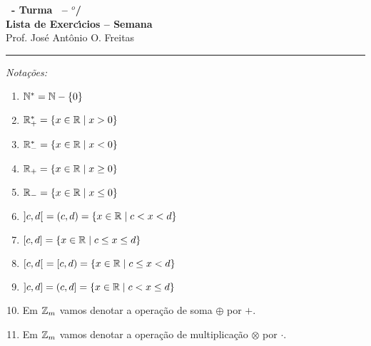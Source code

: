 \documentclass[12pt]{exam}
\begin{document}
    \begin{center}
        {\Large\bf \disciplina\ - Turma \turma\ -- \semestre$^{o}$/\ano} \\ \vspace{9pt} {\large\bf
            Lista de Exerc{\'\i}cios -- Semana \numerosemana}\\ \vspace{9pt} Prof. Jos{\'e} Ant{\^o}nio O. Freitas
    \end{center}
    \hrule

    \vspace{.6cm}

    \begin{center}
        \textit{Nota\c{c}\~oes:}
    \end{center}
    \begin{multicols}{2}
        \begin{enumerate}[label={\roman*})]
            \item $\mathbb{N}^* = \mathbb{N} - \{0\}$

            \item $\mathbb{R}^*_+ = \{x \in \mathbb{R} \mid x > 0\}$

            \item $\mathbb{R}^*_- = \{x \in \mathbb{R} \mid x < 0\}$

            \item $\mathbb{R}_+ = \{x \in \mathbb{R} \mid x \ge 0\}$

            \item $\mathbb{R}_- = \{x \in \mathbb{R} \mid x \le 0\}$

            \item $]c,d[\ = (c,d) = \{x \in \mathbb{R} \mid c < x < d\}$

            \item $[c,d] = \{x \in \mathbb{R} \mid c \le x \le d\}$

            \item $[c,d[\ = [c, d) = \{x \in \mathbb{R} \mid c \le x < d\}$

            \item $]c,d] = (c, d] = \{x \in \mathbb{R} \mid c < x \le d\}$

            \item Em $\mathbb{Z}_m$ vamos denotar a opera\c{c}\~ao de soma $\oplus$ por $+$.

            \item Em $\mathbb{Z}_m$ vamos denotar a opera\c{c}\~ao de multiplica\c{c}\~ao $\otimes$ por $\cdot$.
        \end{enumerate}
    \end{multicols}
\end{document}

